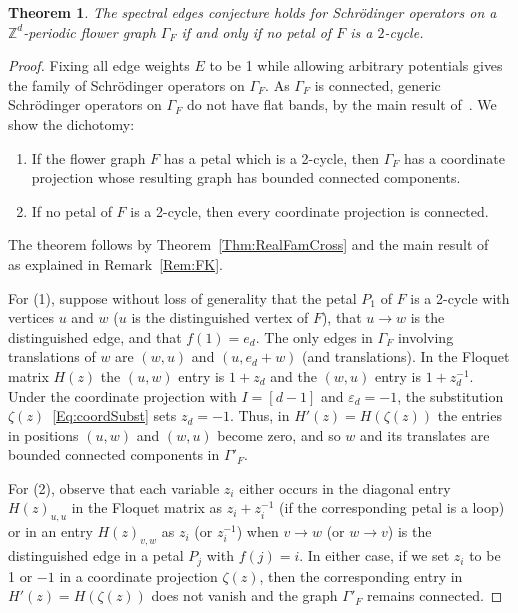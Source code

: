 \documentclass[12pt]{amsart}
\newtheorem{Theorem}{Theorem}[section]
\theoremstyle{remark}
\newcommand{\ZZ}{{\mathbb Z}}
\begin{document}
\begin{Theorem}\label{Thm:Schroedinger}
  The spectral edges conjecture holds for Schr\"odinger operators on a $\ZZ^d$-periodic flower graph $\Gamma_F$ if and only if
  no petal of $F$ is a $2$-cycle.
\end{Theorem}   
\begin{proof}
  Fixing all edge weights $E$ to be 1 while allowing arbitrary potentials gives the family of Schr\"odinger operators on $\Gamma_F$.
  As $\Gamma_F$ is connected, generic Schr\"odinger operators on $\Gamma_F$ do not have flat bands,
  by the main result of~\cite{FaustKachkovskiy}.
  We show the dichotomy:
  \begin{enumerate}
  \item If the flower graph $F$ has a petal which is a 2-cycle, then $\Gamma_F$ has a coordinate projection whose resulting graph 
    has  bounded connected components.
  \item If no petal of $F$ is a 2-cycle, then every coordinate projection is connected.
  \end{enumerate}
  The theorem follows by Theorem~\ref{Thm:RealFamCross} and the  main result of~\cite{FaustKachkovskiy} as explained in Remark~\ref{Rem:FK}.
 
  For (1), suppose without loss of generality that the petal $P_1$ of $F$ is a 2-cycle with vertices $u$ and $w$
  ($u$ is the distinguished vertex of $F$),
  that $u\to w$ is the distinguished edge, and that $f(1)=e_d$.
  The only edges in $\Gamma_F$ involving translations of $w$ are $(w,u)$ and $(u,e_d+w)$ (and translations).
  In the Floquet matrix $H(z)$ the $(u,w)$ entry is $1+z_d$ and the $(w,u)$ entry is $1+z_d^{-1}$.
  Under the coordinate projection with $I=[d{-}1]$ and $\varepsilon_d=-1$, 
  the substitution $\zeta(z)$~\eqref{Eq:coordSubst} sets $z_d=-1$.
  Thus, in $H'(z)=H(\zeta(z))$ the entries in positions $(u,w)$ and $(w,u)$ become zero, and so $w$ and its translates are
  bounded connected components in $\Gamma'_F$.

  For (2), observe that each variable $z_i$ either occurs in the diagonal entry $H(z)_{u,u}$ in the Floquet matrix
  as $z_i+z_i^{-1}$ (if the corresponding petal is a loop) or in an entry $H(z)_{v,w}$ as $z_i$ (or $z_i^{-1}$) when $v\to w$ (or $w\to v$)
  is the distinguished edge in a petal $P_j$ with $f(j)=i$.
  In either case, if we set $z_i$ to be 1 or $-1$ in a coordinate projection $\zeta(z)$, then the corresponding entry in
  $H'(z)=H(\zeta(z))$ does not vanish and the graph $\Gamma'_F$ remains connected.
\end{proof}
\end{document}

